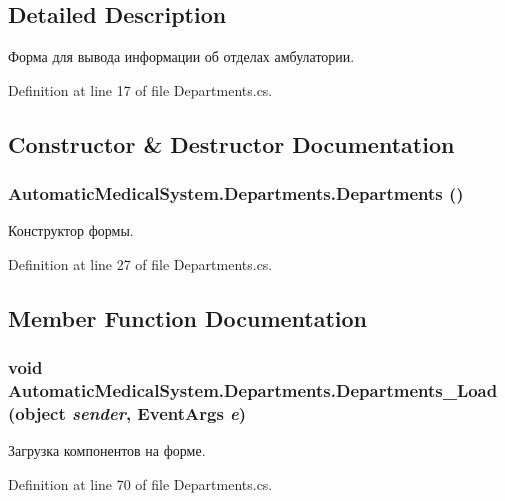 \subsection{Detailed Description}
Форма для вывода информации об отделах амбулатории. 



Definition at line 17 of file Departments.cs.

\subsection{Constructor \& Destructor Documentation}
\subsubsection[{Departments}]{\setlength{\rightskip}{0pt plus 5cm}AutomaticMedicalSystem.Departments.Departments ()}\label{class_automatic_medical_system_1_1_departments_eb1cc3edc017937b1f2e256e4cfb1f55}


Конструктор формы. 



Definition at line 27 of file Departments.cs.

\subsection{Member Function Documentation}
\subsubsection[{Departments\_\-Load}]{\setlength{\rightskip}{0pt plus 5cm}void AutomaticMedicalSystem.Departments.Departments\_\-Load (object {\em sender}, \/  EventArgs {\em e})}\label{class_automatic_medical_system_1_1_departments_3042203d4306940071a4eedf841d69e5}


Загрузка компонентов на форме. 



Definition at line 70 of file Departments.cs.
